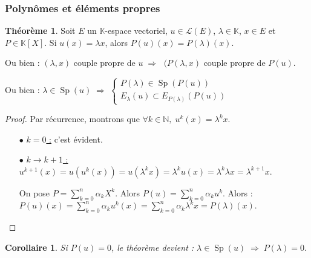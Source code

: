 \documentclass[12pt]{book}
\let\ensembleNombre\mathbb
\newcommand*\N{\ensuremath{\ensembleNombre{N}}}
\newcommand*\K{\ensuremath{\ensembleNombre{K}}}
\DeclareMathOperator{\Sp}{Sp}
\newtheorem*{cor}{Corollaire}
\theoremstyle{definition}
\newtheorem{thme}{Théorème}[chapter]
\theoremstyle{remark}
\newenvironment{fthme}
  {\begin{mdframed}[roundcorner=10pt, linewidth=2pt]\begin{thme}}
  {\end{thme}\end{mdframed}}
\begin{document}
		\subsubsection{Polynômes et éléments propres}
	\begin{fthme}
	Soit $E$ un $\K$-espace vectoriel, $u \in \mathcal L(E)$, $\lambda \in \K$, $x \in E$ et $P \in \K[X]$. Si $u(x) = \lambda x$, alors $P(u)(x) = P(\lambda)(x)$.
	
	Ou bien : $(\lambda, x)$ couple propre de $u \; \Longrightarrow \;$ $(P(\lambda, x)$ couple propre de $P(u)$.
	
	Ou bien : $\lambda \in \Sp(u) \;\Longrightarrow\; \begin{cases}
													  P(\lambda) \in \Sp(P(u)) \\
													  E_{\lambda}(u) \subset E_{P(\lambda)}(P(u))
													  \end{cases}$
	\end{fthme}
	\begin{proof}
	Par récurrence, montrons que $ \forall k \in \N,\; u^k(x) = \lambda^k x$.
	\begin{itemize}
	\item[$\bullet$ \underline{$k = 0$ :}] c'est évident.
	\item[$\bullet$ \underline{$k \to k+1$ :}] $u^{k+1}(x) = u(u^k(x)) = u(\lambda ^kx) = \lambda^k u(x) = \lambda^k \lambda x = \lambda^{k+1}x$. 
	
	On pose $P = \sum_{k=0}^n \alpha_k X^k$. Alors $P(u) = \sum_{k=0}^n \alpha_k u^k$. Alors : $P(u)(x) = \sum_{k=0}^n \alpha_k u^k(x) = \sum_{k=0}^n \alpha_k \lambda^k x = P(\lambda)(x).$ \qedhere
	\end{itemize}
	\end{proof}
	
	\begin{cor}
	Si $P(u) = 0$, le théorème devient : $\boxed{\lambda \in \Sp(u) \;\Longrightarrow\; P(\lambda) = 0.}$
	\end{cor}
	
\end{document}

